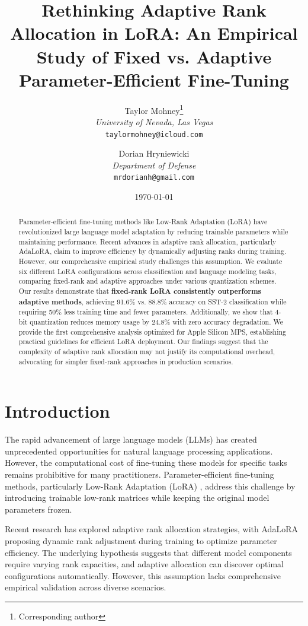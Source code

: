 \documentclass[11pt,a4paper]{article}
\title{Rethinking Adaptive Rank Allocation in LoRA: An Empirical Study of Fixed vs. Adaptive Parameter-Efficient Fine-Tuning}
\author{
Taylor Mohney\thanks{Corresponding author} \\
\textit{University of Nevada, Las Vegas} \\
\texttt{taylormohney@icloud.com}
\and
Dorian Hryniewicki \\
\textit{Department of Defense} \\
\texttt{mrdorianh@gmail.com}
}
\date{\today}
\begin{document}
\maketitle

\begin{abstract}
Parameter-efficient fine-tuning methods like Low-Rank Adaptation (LoRA) have revolutionized large language model adaptation by reducing trainable parameters while maintaining performance. Recent advances in adaptive rank allocation, particularly AdaLoRA, claim to improve efficiency by dynamically adjusting ranks during training. However, our comprehensive empirical study challenges this assumption. We evaluate six different LoRA configurations across classification and language modeling tasks, comparing fixed-rank and adaptive approaches under various quantization schemes. Our results demonstrate that \textbf{fixed-rank LoRA consistently outperforms adaptive methods}, achieving 91.6\% vs. 88.8\% accuracy on SST-2 classification while requiring 50\% less training time and fewer parameters. Additionally, we show that 4-bit quantization reduces memory usage by 24.8\% with zero accuracy degradation. We provide the first comprehensive analysis optimized for Apple Silicon MPS, establishing practical guidelines for efficient LoRA deployment. Our findings suggest that the complexity of adaptive rank allocation may not justify its computational overhead, advocating for simpler fixed-rank approaches in production scenarios.
\end{abstract}

\section{Introduction}

The rapid advancement of large language models (LLMs) has created unprecedented opportunities for natural language processing applications. However, the computational cost of fine-tuning these models for specific tasks remains prohibitive for many practitioners. Parameter-efficient fine-tuning methods, particularly Low-Rank Adaptation (LoRA) \cite{hu2021lora}, address this challenge by introducing trainable low-rank matrices while keeping the original model parameters frozen.

Recent research has explored adaptive rank allocation strategies, with AdaLoRA \cite{zhang2023adaptive} proposing dynamic rank adjustment during training to optimize parameter efficiency. The underlying hypothesis suggests that different model components require varying rank capacities, and adaptive allocation can discover optimal configurations automatically. However, this assumption lacks comprehensive empirical validation across diverse scenarios.
\end{document}
